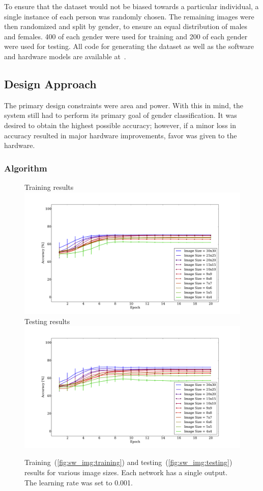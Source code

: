\documentclass[10pt,journal]{IEEEtran}
\newcommand{\subfig}[1]{~(\ref{#1})}
\begin{document}
		To ensure that the dataset would not be biased towards a particular individual, a single instance of each person was randomly chosen. The remaining images were then randomized and split by gender, to ensure an equal distribution of males and females. 400 of each gender were used for training and 200 of each gender were used for testing. All code for generating the dataset as well as the software and hardware models are available at~\cite{gitrepo}.
	
	\subsection{Design Approach}
		The primary design constraints were area and power. With this in mind, the system still had to perform its primary goal of gender classification. It was desired to obtain the highest possible accuracy; however, if a minor loss in accuracy resulted in major hardware improvements, favor was given to the hardware.
		
		\subsubsection{Algorithm}
			\begin{figure}[t!]
				\captionsetup[subfigure]{position=b}
				\centering
				\hfill
				\subcaptionbox
				{
					Training results
					\label{fig:sw_img:training}
				}
				{\includegraphics[width=0.49\linewidth]{sw_img_training}}
				\hfill
				\subcaptionbox
				{
					Testing results
					\label{fig:sw_img:testing}
				}
				{\includegraphics[width=0.49\linewidth]{sw_img_testing}}
				\hfill
				\caption{Training\subfig{fig:sw_img:training} and testing\subfig{fig:sw_img:testing} results for various image sizes. Each network has a single output. The learning rate was set to 0.001.}
				\label{fig:sw_img}
			\end{figure}
			
\end{document}
